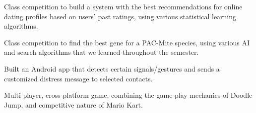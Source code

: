 \documentclass[letterpaper]{deedy-resume} %
\begin{document}
\begin{minipage}[t]{0.7\textwidth}
\sectionspace %


Class competition to build a system with the best recommendations for online dating profiles based on users' past ratings, using various statistical learning algorithms.

\sectionspace %



Class competition to find the best gene for a PAC-Mite species, using various AI and search algorithms that we learned throughout the semester.

\sectionspace %



Built an Android app that detects certain signals/gestures and sends a customized distress message to selected contacts.

\sectionspace %



Multi-player, cross-platform game, combining the game-play mechanics of Doodle Jump, and competitive nature of Mario Kart.

\sectionspace %

\end{minipage} %

\end{document}
